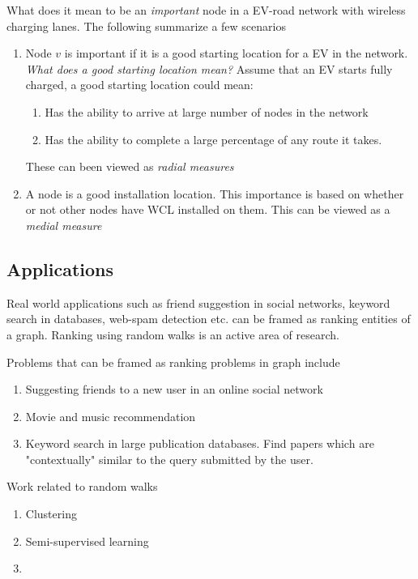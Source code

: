 \documentclass[envcountsame]{llncs}
\begin{document}
What does it mean to be an \emph{important} node in a EV-road network with wireless charging lanes. The following summarize a few scenarios
\begin{enumerate}
\item Node $v$ is important if it is a good starting location for a EV in the network. \emph{What does a good starting location mean?} Assume that an EV starts fully charged, a good starting location could mean:
\begin{enumerate}
\item Has the ability to arrive at large number of nodes in the network
\item Has the ability to complete a large percentage of any route it takes.
\end{enumerate}
These can been viewed as \emph{radial measures}
\item A node is a good installation location. This importance is based on whether or not other nodes have WCL installed on them. This can be viewed as a \emph{medial measure}
\end{enumerate}
%
%
%
\printnomenclature


\subsection{Applications}

\cite{sarkar2011random} Real world applications such as friend suggestion in social networks, keyword search in databases, web-spam detection etc. can be framed as ranking entities of a graph. Ranking using random walks is an active area of research. 

Problems that can be framed as ranking problems in graph include
\begin{enumerate}
\item Suggesting friends to a new user in an online social network
\item Movie and music recommendation
\item Keyword search in large publication databases. Find papers which are "contextually" similar to the query submitted by the user. 

\end{enumerate}
Work related to random walks
\begin{enumerate}
\item Clustering
\item Semi-supervised learning
\item 
\end{enumerate}
\end{document}
